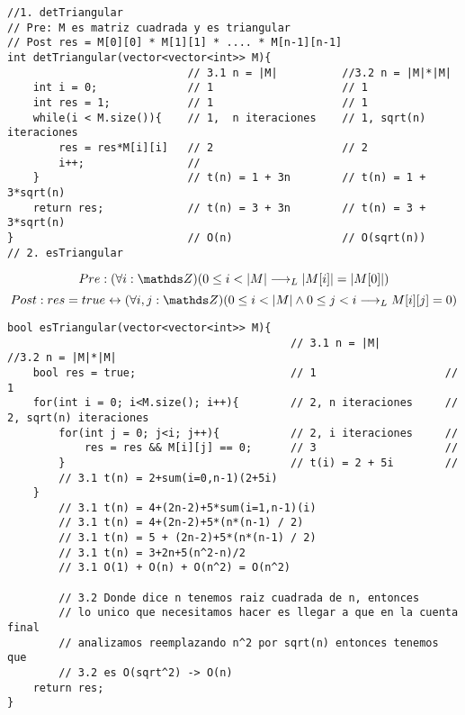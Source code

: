 \documentclass{article}
\begin{document}
\begin{lstlisting}
//1. detTriangular
// Pre: M es matriz cuadrada y es triangular
// Post res = M[0][0] * M[1][1] * .... * M[n-1][n-1]
int detTriangular(vector<vector<int>> M){ 
                            // 3.1 n = |M|          //3.2 n = |M|*|M|
    int i = 0;              // 1                    // 1
    int res = 1;            // 1                    // 1
    while(i < M.size()){    // 1,  n iteraciones    // 1, sqrt(n) iteraciones
        res = res*M[i][i]   // 2                    // 2
        i++;                //                      
    }                       // t(n) = 1 + 3n        // t(n) = 1 + 3*sqrt(n)
    return res;             // t(n) = 3 + 3n        // t(n) = 3 + 3*sqrt(n)
}                           // O(n)                 // O(sqrt(n))
// 2. esTriangular
\end{lstlisting}
\begin{equation}
    Pre: (\forall i:\ent)(0 \leq i < |M| \implicaLuego \longitud{M[i]} = \longitud{M[0]})
\end{equation}
\begin{equation}
        Post: res = true \Iff (\forall i,j:\ent)(0 \leq i < |M| \wedge 0 \leq j < i \implicaLuego \\M[i][j] = 0)
\end{equation}
\begin{lstlisting}
bool esTriangular(vector<vector<int>> M){
                                            // 3.1 n = |M|          //3.2 n = |M|*|M|
    bool res = true;                        // 1                    // 1
    for(int i = 0; i<M.size(); i++){        // 2, n iteraciones     // 2, sqrt(n) iteraciones
        for(int j = 0; j<i; j++){           // 2, i iteraciones     // 
            res = res && M[i][j] == 0;      // 3                    // 
        }                                   // t(i) = 2 + 5i        // 
        // 3.1 t(n) = 2+sum(i=0,n-1)(2+5i)
    }                                       
        // 3.1 t(n) = 4+(2n-2)+5*sum(i=1,n-1)(i)
        // 3.1 t(n) = 4+(2n-2)+5*(n*(n-1) / 2)
        // 3.1 t(n) = 5 + (2n-2)+5*(n*(n-1) / 2)
        // 3.1 t(n) = 3+2n+5(n^2-n)/2
        // 3.1 O(1) + O(n) + O(n^2) = O(n^2)

        // 3.2 Donde dice n tenemos raiz cuadrada de n, entonces
        // lo unico que necesitamos hacer es llegar a que en la cuenta final
        // analizamos reemplazando n^2 por sqrt(n) entonces tenemos que 
        // 3.2 es O(sqrt^2) -> O(n)
    return res;
}
\end{lstlisting}
\end{document}
